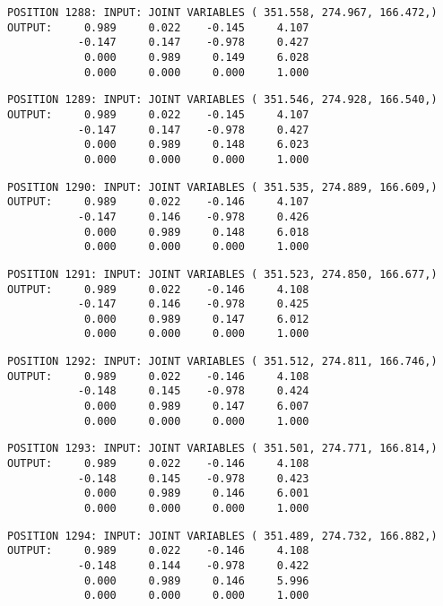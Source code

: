 \begin{verbatim}
POSITION 1288: INPUT: JOINT VARIABLES ( 351.558, 274.967, 166.472,)
OUTPUT:     0.989     0.022    -0.145     4.107
           -0.147     0.147    -0.978     0.427
            0.000     0.989     0.149     6.028
            0.000     0.000     0.000     1.000
\end{verbatim} \pagebreak[1]\begin{verbatim}
POSITION 1289: INPUT: JOINT VARIABLES ( 351.546, 274.928, 166.540,)
OUTPUT:     0.989     0.022    -0.145     4.107
           -0.147     0.147    -0.978     0.427
            0.000     0.989     0.148     6.023
            0.000     0.000     0.000     1.000
\end{verbatim} \pagebreak[1]\begin{verbatim}
POSITION 1290: INPUT: JOINT VARIABLES ( 351.535, 274.889, 166.609,)
OUTPUT:     0.989     0.022    -0.146     4.107
           -0.147     0.146    -0.978     0.426
            0.000     0.989     0.148     6.018
            0.000     0.000     0.000     1.000
\end{verbatim} \pagebreak[1]\begin{verbatim}
POSITION 1291: INPUT: JOINT VARIABLES ( 351.523, 274.850, 166.677,)
OUTPUT:     0.989     0.022    -0.146     4.108
           -0.147     0.146    -0.978     0.425
            0.000     0.989     0.147     6.012
            0.000     0.000     0.000     1.000
\end{verbatim} \pagebreak[1]\begin{verbatim}
POSITION 1292: INPUT: JOINT VARIABLES ( 351.512, 274.811, 166.746,)
OUTPUT:     0.989     0.022    -0.146     4.108
           -0.148     0.145    -0.978     0.424
            0.000     0.989     0.147     6.007
            0.000     0.000     0.000     1.000
\end{verbatim} \pagebreak[1]\begin{verbatim}
POSITION 1293: INPUT: JOINT VARIABLES ( 351.501, 274.771, 166.814,)
OUTPUT:     0.989     0.022    -0.146     4.108
           -0.148     0.145    -0.978     0.423
            0.000     0.989     0.146     6.001
            0.000     0.000     0.000     1.000
\end{verbatim} \pagebreak[1]\begin{verbatim}
POSITION 1294: INPUT: JOINT VARIABLES ( 351.489, 274.732, 166.882,)
OUTPUT:     0.989     0.022    -0.146     4.108
           -0.148     0.144    -0.978     0.422
            0.000     0.989     0.146     5.996
            0.000     0.000     0.000     1.000
\end{verbatim} \pagebreak[1]\begin{verbatim}

\end{verbatim}
